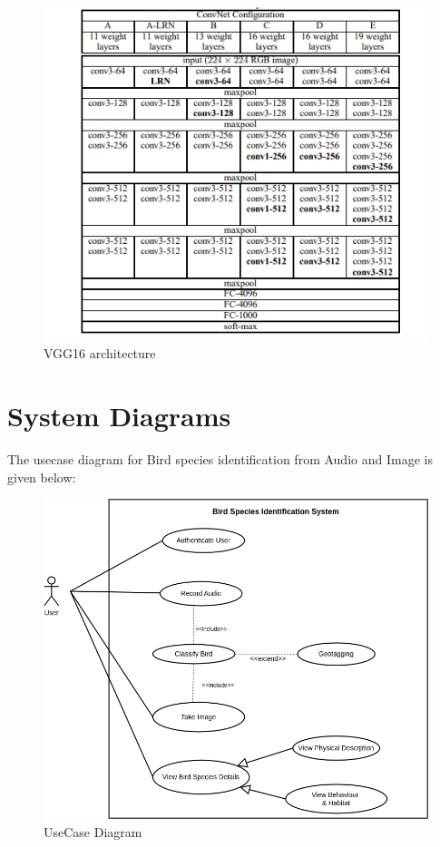 \begin{figure}[h!]
    \centering
        \includegraphics[scale=0.8]{images/VGG16.png}
        \caption{VGG16 architecture}%
    \end{figure}


\newpage
\section{System Diagrams}
The usecase diagram for Bird species identification from Audio and Image is given below:
\vspace{1 cm}
\begin{figure}[h!]
    \centering
        \includegraphics[scale=0.5]{images/usecase.png}
        \caption{UseCase Diagram}%
    \end{figure}




